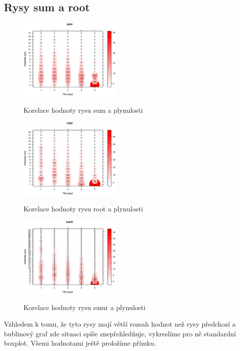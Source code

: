 \documentclass[12pt,a4paper]{report}
\begin{document}
\subsection{Rysy sum a root}
\begin{figure}[!htb]
\begin{center}
  \centering\includegraphics[width=50mm]{./grafy/rysy/sum-c.eps}
  \caption{Korelace hodnoty rysu sum a plynulosti}\label{gr:sumc}
\endminipage\quad
{}
  \centering\includegraphics[width=50mm]{./grafy/rysy/root-c.eps}
  \caption{Korelace hodnoty rysu root a plynulosti}\label{gr:rootc}
\endminipage\quad
{}
  \centering\includegraphics[width=50mm]{./grafy/rysy/sumr-c.eps}
  \caption{Korelace hodnoty rysu sumr a plynulosti}\label{gr:sumrc}
\endminipage
\end{center}
\end{figure}

Vzhledem k tomu, že tyto rysy mají větší rozsah hodnot než rysy předchozí a bublinový graf zde situaci spíše znepřehledňuje, vykreslíme pro ně standardní box\-plot. Všemi hodnotami ještě proložíme přímku.
\end{document}
